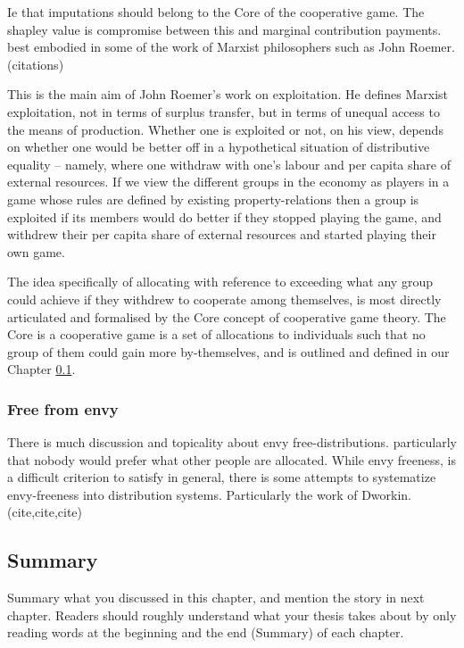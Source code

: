 Ie that imputations should belong to the Core of the cooperative game.
The shapley value is compromise between this and marginal contribution payments.
best embodied in some of the work of Marxist philosophers such as John Roemer. (citations)

\begin{displayquote}
This is the main aim of John Roemer's work on exploitation. He defines Marxist exploitation, not in terms of surplus transfer, but in terms of unequal access to the means of production. Whether one is exploited or not, on his view, depends on whether one would be better off in a hypothetical situation of distributive equality -- namely, where one withdraw with one's labour and per capita share of external resources. If we view the different groups in the economy as players in a game whose rules are defined by existing property-relations then a group is exploited if its members would do better if they stopped playing the game, and withdrew their per capita share of external resources and started playing their own game.\cite{kymlicka2002contemporary}
\end{displayquote}


The idea specifically of allocating with reference to exceeding what any group could achieve if they withdrew to cooperate among themselves, is most directly articulated and formalised by the Core concept of cooperative game theory.
The Core is a cooperative game is a set of allocations to individuals such that no group of them could gain more by-themselves, and is outlined and defined in our Chapter \ref{}.


\subsubsection{Free from envy}

There is much discussion and topicality about envy free-distributions.
particularly that nobody would prefer what other people are allocated.
While envy freeness, is a difficult criterion to satisfy in general, there is some attempts to systematize envy-freeness into distribution systems.
Particularly the work of Dworkin. (cite,cite,cite)







\subsection{Summary}
Summary what you discussed in this chapter, and mention the story in next
chapter. Readers should roughly understand what your thesis takes about by only reading
words at the beginning and the end (Summary) of each chapter.



